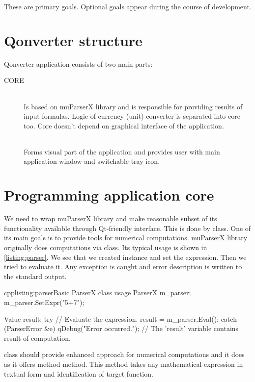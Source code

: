 These are primary goals. Optional goals appear during the course of development.

\section{Qonverter structure}
Qonverter application consists of two main parts:
\begin{description}
\item[CORE] \hfill \\
Is based on muParserX library and is responsible for providing results of input formulas. Logic of currency (unit) converter is separated into core too. Core doesn't depend on graphical interface of the application.
\item[] \hfill \\
Forms visual part of the application and provides user with main application window and switchable tray icon.
\end{description}

\section{Programming application core}
We need to wrap muParserX library and make reasonable subset of its functionality available through Qt-friendly interface. This is done by class. One of its main goals is to provide tools for numerical computations. muParserX library originally does computations via class. Its typical usage is shown in \autoref{listing:parser}. We see that we created instance and set the expression. Then we tried to evaluate it. Any exception is caught and error description is written to the standard output.

\begin{fdoccode}{cpp}{listing:parser}{Basic ParserX class usage}
ParserX m_parser;
m_parser.SetExpr("5+7");

Value result;
try {
	// Evaluate the expression.
	result = m_parser.Eval();
}
catch (ParserError &e) {
	qDebug("Error occurred.");
}
// The 'result' variable contains result of computation.
\end{fdoccode}

\indent{} class should provide enhanced approach for numerical computations and it does as it offers method method. This method takes any mathematical expression in textual form and identification of target function.

